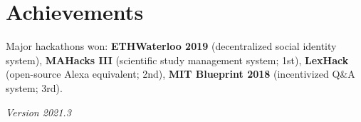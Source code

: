 \documentclass[letterpaper,11pt]{article}
\begin{document}
\section{Achievements}

Major hackathons won: \textbf{ETHWaterloo 2019} (decentralized social identity
system), \textbf{MAHacks III} (scientific study management system; 1st), \textbf{LexHack}
(open-source Alexa equivalent; 2nd), \textbf{MIT Blueprint 2018} (incentivized
Q\&A system; 3rd).

\begin{flushright}
     \textit{Version 2021.3}
\end{flushright}
\end{document}
